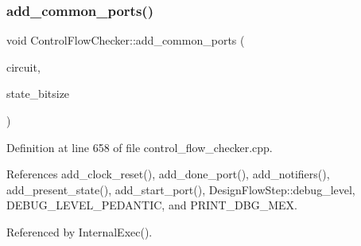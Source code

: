 \subsubsection{\texorpdfstring{add\+\_\+common\+\_\+ports()}{add\_common\_ports()}}
{\footnotesize\ttfamily void Control\+Flow\+Checker\+::add\+\_\+common\+\_\+ports (\begin{DoxyParamCaption}\item[{\hyperlink{structural__objects_8hpp_a8ea5f8cc50ab8f4c31e2751074ff60b2}{structural\+\_\+object\+Ref}}]{circuit,  }\item[{unsigned int}]{state\+\_\+bitsize }\end{DoxyParamCaption})\hspace{0.3cm}{\ttfamily [protected]}}



Definition at line 658 of file control\+\_\+flow\+\_\+checker.\+cpp.



References add\+\_\+clock\+\_\+reset(), add\+\_\+done\+\_\+port(), add\+\_\+notifiers(), add\+\_\+present\+\_\+state(), add\+\_\+start\+\_\+port(), Design\+Flow\+Step\+::debug\+\_\+level, D\+E\+B\+U\+G\+\_\+\+L\+E\+V\+E\+L\+\_\+\+P\+E\+D\+A\+N\+T\+IC, and P\+R\+I\+N\+T\+\_\+\+D\+B\+G\+\_\+\+M\+EX.



Referenced by Internal\+Exec().

